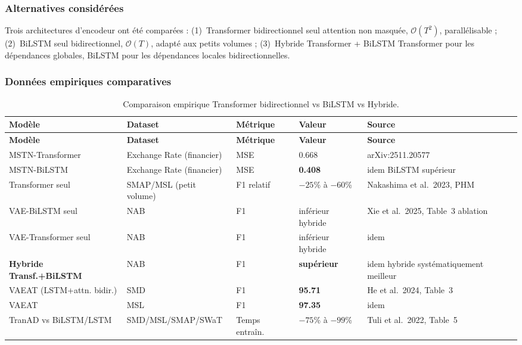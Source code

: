 \documentclass[12pt,a4paper]{article}
\begin{document}
\subsubsection{Alternatives considérées}

Trois architectures d'encodeur ont été comparées : (1)~Transformer
bidirectionnel seul  attention non masquée, $\mathcal{O}(T^2)$, parallélisable ;
(2)~BiLSTM seul  bidirectionnel, $\mathcal{O}(T)$, adapté aux petits volumes ;
(3)~Hybride Transformer + BiLSTM  Transformer pour les dépendances globales,
BiLSTM pour les dépendances locales bidirectionnelles.

\subsubsection{Données empiriques comparatives}

\begin{longtable}{p{4.5cm}p{3cm}p{2cm}p{2cm}p{4cm}}
\caption{Comparaison empirique Transformer bidirectionnel vs BiLSTM vs Hybride.}
\label{tab:d1}\\
\toprule
\textbf{Modèle} & \textbf{Dataset} & \textbf{Métrique} &
\textbf{Valeur} & \textbf{Source} \\
\midrule
\endfirsthead
\toprule
\textbf{Modèle} & \textbf{Dataset} & \textbf{Métrique} &
\textbf{Valeur} & \textbf{Source} \\
\midrule
\endhead
\bottomrule\endlastfoot
MSTN-Transformer & Exchange Rate (financier) & MSE & 0.668 &
arXiv:2511.20577 \\
MSTN-BiLSTM & Exchange Rate (financier) & MSE & \textbf{0.408} &
idem  BiLSTM supérieur \\
\midrule
Transformer seul & SMAP/MSL (petit volume) & F1 relatif & $-25$\% à $-60$\% &
Nakashima et al.\ 2023, PHM \\
\midrule
VAE-BiLSTM seul & NAB & F1 & inférieur hybride &
Xie et al.\ 2025, Table~3 ablation \\
VAE-Transformer seul & NAB & F1 & inférieur hybride & idem \\
\textbf{Hybride Transf.+BiLSTM} & NAB & F1 & \textbf{supérieur} &
idem  hybride systématiquement meilleur \\
\midrule
VAEAT (LSTM+attn. bidir.) & SMD & F1 & \textbf{95.71} &
He et al.\ 2024, Table~3 \\
VAEAT & MSL & F1 & \textbf{97.35} & idem \\
\midrule
TranAD vs BiLSTM/LSTM & SMD/MSL/SMAP/SWaT & Temps entraîn. &
$-75$\% à $-99$\% & Tuli et al.\ 2022, Table~5 \\
\end{longtable}
\end{document}
